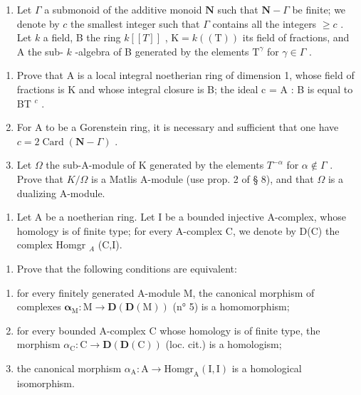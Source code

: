 \begin{enumerate}
\def\labelenumi{\arabic{enumi})}
\setcounter{enumi}{8}
\tightlist
\item
  Let \(\Gamma\) a submonoid of the additive monoid \(\mathbf{N}\) such that \(\mathbf{N} - \Gamma\) be finite; we denote by \(c\) the smallest integer such that \(\Gamma\) contains all the integers \(\geqslant c\) . Let \(k\) a field, B the ring \(k[[T]]\) , \(\mathrm{K} = k((\mathrm{T}))\) its field of fractions, and A the sub- \(k\) -algebra of B generated by the elements \(\mathrm{T}^{\gamma}\) for \(\gamma \in \Gamma\) .
\end{enumerate}

\begin{enumerate}
\def\labelenumi{\alph{enumi})}
\item
  Prove that A is a local integral noetherian ring of dimension 1, whose field of fractions is K and whose integral closure is B; the ideal c = A : B is equal to BT \(^{c}\) .
\item
  For A to be a Gorenstein ring, it is necessary and sufficient that one have \(c = 2\operatorname{Card}(\mathbf{N} - \Gamma)\) .
\item
  Let \(\Omega\) the sub-A-module of K generated by the elements \(T^{-\alpha}\) for \(\alpha \notin \Gamma\) . Prove that \(K/\Omega\) is a Matlis A-module (use prop. 2 of § 8), and that \(\Omega\) is a dualizing A-module.
\end{enumerate}

\begin{enumerate}
\def\labelenumi{\arabic{enumi})}
\setcounter{enumi}{9}
\tightlist
\item
  Let A be a noetherian ring. Let I be a bounded injective A-complex, whose homology is of finite type; for every A-complex C, we denote by D(C) the complex Homgr \(_{A}\) (C,I).
\end{enumerate}

\begin{enumerate}
\def\labelenumi{\alph{enumi})}
\tightlist
\item
  Prove that the following conditions are equivalent:
\end{enumerate}

\begin{enumerate}
\def\labelenumi{(\roman{enumi})}
\item
  for every finitely generated A-module M, the canonical morphism of complexes \(\boldsymbol{\alpha}_{\mathrm{M}}:\mathrm{M}\to\mathbf{D}(\mathbf{D}(\mathrm{M}))\) (n° 5) is a homomorphism;
\item
  for every bounded A-complex C whose homology is of finite type, the morphism \(\alpha_{\mathrm{C}}: \mathrm{C} \to \mathbf{D}(\mathbf{D}(\mathrm{C}))\) (loc. cit.) is a homologism;
\item
  the canonical morphism \(\alpha_{\mathrm{A}}:\mathrm{A}\to \mathrm{Homgr}_{\mathrm{A}}(\mathrm{I},\mathrm{I})\) is a homological isomorphism.
\end{enumerate}

